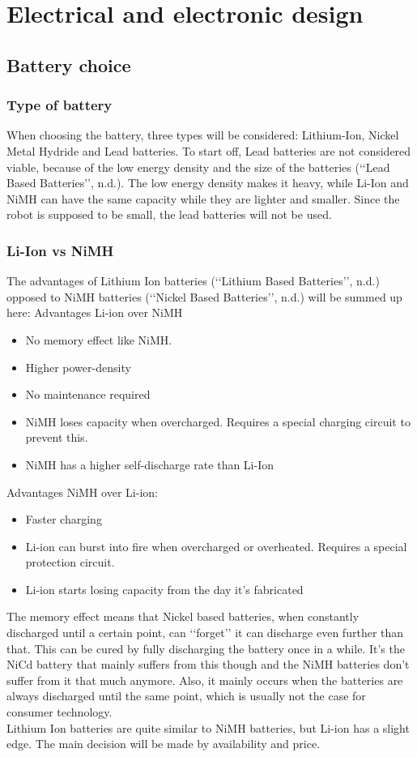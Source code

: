 \documentclass[11pt,twoside,a4paper]{report}
\begin{document}
\section{Electrical and electronic design}
\subsection{Battery choice}
\subsubsection{Type of battery}
When choosing the battery, three types will be considered: Lithium-Ion, Nickel Metal Hydride and Lead batteries. To start off, Lead batteries are not considered viable, because of the low energy density and the size of the batteries (\lq\lq{}Lead Based Batteries\rq\rq{}, n.d.). The low energy density makes it heavy, while Li-Ion and NiMH can have the same capacity while they are lighter and smaller. Since the robot is supposed to be small, the lead batteries will not be used. 
\subsubsection{Li-Ion vs NiMH}
The advantages of Lithium Ion batteries (\lq\lq{}Lithium Based Batteries\rq\rq{}, n.d.) opposed to NiMH batteries (\lq\lq{}Nickel Based Batteries\rq\rq{}, n.d.) will be summed up here:
Advantages Li-ion over NiMH
\begin{itemize}
\item No memory effect like NiMH.
\item Higher power-density
\item No maintenance required
\item NiMH loses capacity when overcharged. Requires a special charging circuit to prevent this.
\item NiMH has a higher self-discharge rate than Li-Ion
\end{itemize}
Advantages NiMH over Li-ion:
\begin{itemize}
\item Faster charging
\item Li-ion can burst into fire when overcharged or overheated. Requires a special protection circuit. 
\item Li-ion starts losing capacity from the day it\rq{}s fabricated
\end{itemize}
The memory effect means that Nickel based batteries, when constantly discharged until a certain point, can \lq\lq{}forget\rq\rq{} it can discharge even further than that.  This can be cured by fully discharging the battery once in a while. It\rq{}s the NiCd battery that mainly suffers from this though and the NiMH batteries don\rq{}t suffer  from it that much anymore. Also, it mainly occurs when the batteries are always discharged until the same point, which is usually not the case for consumer technology.\\ 
Lithium Ion batteries are quite similar to NiMH batteries, but Li-ion has a slight edge. The main decision will be made by availability and price.
\end{document}
